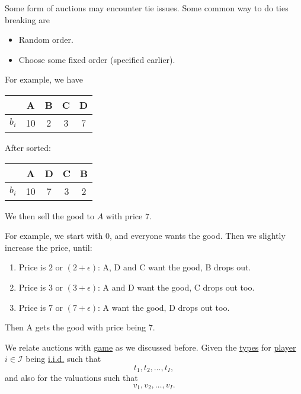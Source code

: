 \begin{note}
	Some form of auctions may encounter tie issues. Some common way to do ties breaking are
	\begin{itemize}
		\item Random order.
		\item Choose some fixed order (specified earlier).
	\end{itemize}
\end{note}

\begin{eg}
	For example, we have
	\begin{table}[H]
		\centering
		\begin{tabular}{c|c|c|c|c}
			\toprule
			          & A  & B & C & D \\
			\midrule
			\(b_{i}\) & 10 & 2 & 3 & 7 \\
			\bottomrule
		\end{tabular}
	\end{table}
	After sorted:
	\begin{table}[H]
		\centering
		\begin{tabular}{c|c|c|c|c}
			\toprule
			          & A  & D & C & B \\
			\midrule
			\(b_{i}\) & 10 & 7 & 3 & 2 \\
			\bottomrule
		\end{tabular}
	\end{table}
	We then sell the good to \(A\) with price \(7\).
\end{eg}

\begin{eg}
	For example, we start with \(0\), and everyone wants the good. Then we slightly increase the price, until:
	\begin{enumerate}
		\item Price is \(2\) or \((2+\epsilon)\):
		      A, D and C want the good, B drops out.
		\item Price is \(3\) or \((3+\epsilon)\):
		      A and D want the good, C drops out too.
		\item Price is \(7\) or \((7+\epsilon)\):
		      A want the good, D drops out too.
	\end{enumerate}
	Then A gets the good with price being \(7\).
\end{eg}

We relate auctions with \hyperref[def:mathematical-Bayesian-game]{game} as we discussed before. Given the \hyperref[def:type]{types} for \hyperref[def:player]{player} \(i\in \mathcal{I} \) being \hyperref[def:i.i.d.]{i.i.d.} such that
\[
	t_1, t_2, \dots , t_I,
\]
and also for the valuations such that
\[
	v_1, v_2, \dots , v_I.
\]

